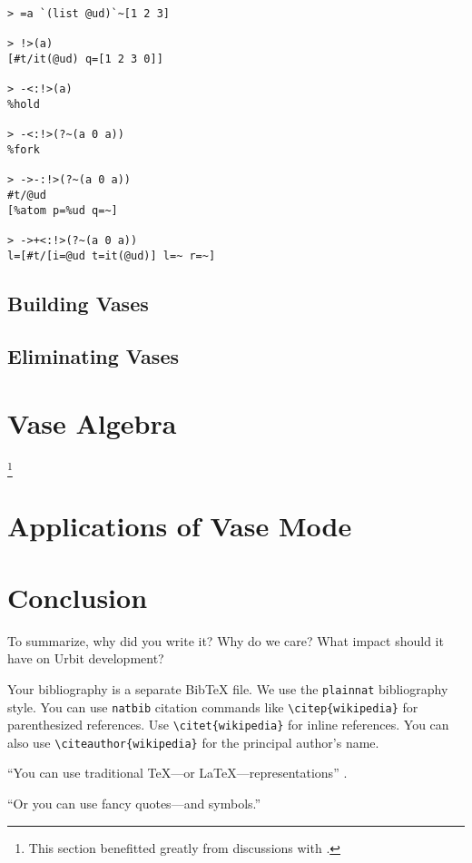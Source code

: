 \documentclass[twoside]{article}
\begin{document}
\begin{lstlisting}[style=listingcode]
> =a `(list @ud)`~[1 2 3]

> !>(a)
[#t/it(@ud) q=[1 2 3 0]]

> -<:!>(a)
%hold

> -<:!>(?~(a 0 a))  
%fork

> ->-:!>(?~(a 0 a))  
#t/@ud
[%atom p=%ud q=~]

> ->+<:!>(?~(a 0 a))  
l=[#t/[i=@ud t=it(@ud)] l=~ r=~]
\end{lstlisting}

\subsection{Building Vases}

\subsection{Eliminating Vases}



\section[Vase Algebra]{Vase Algebra}\footnote{This section benefitted greatly from discussions with .}




\section{Applications of Vase Mode}



\section{Conclusion}

To summarize, why did you write it?  Why do we care?  What impact should it have on Urbit development?

Your bibliography is a separate BibTeX file.  We use the \texttt{plainnat} bibliography style.  You can use \texttt{natbib} citation commands like \texttt{\textbackslash citep\{wikipedia\}} for parenthesized references.  Use \texttt{\textbackslash citet\{wikipedia\}} for inline references.  You can also use \texttt{\textbackslash citeauthor\{wikipedia\}} for the principal author's name.

``You can use traditional TeX---or LaTeX---representations'' \citep{Varney1987}.

“Or you can use fancy quotes—and symbols.”

\printbibliography
\end{document}
